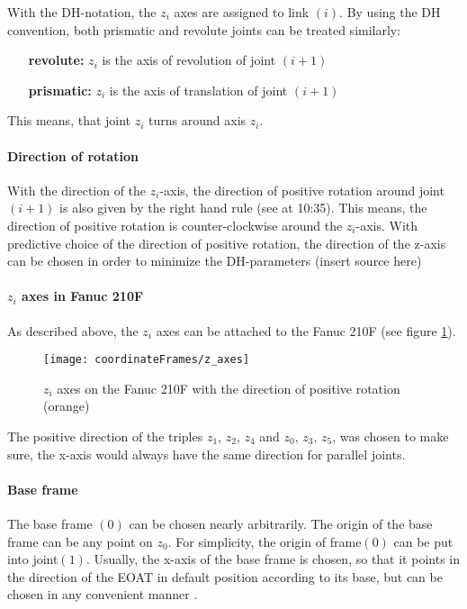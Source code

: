 With the DH-notation, the $z_i$ axes are assigned to link $(i)$. 
By using the  DH convention, both prismatic and revolute joints can be treated similarly: %
\begin{itemize}[wide=\parindent]
	\item[\textbf{revolute:}] $z_i$ is the axis of revolution of joint $(i+1)$
	\item[\textbf{prismatic:}] $z_i$ is the axis of translation of joint $(i+1)$
\end{itemize}
This means, that joint $z_i$ turns around axis $z_i$.

\paragraph{Direction of rotation}
With the direction of the $z_i$-axis, the direction of positive rotation around joint $(i+1)$ is also given by the right hand rule (see \cite{Angela_U1S2P1} at 10:35). This means, the direction of positive rotation is counter-clockwise around the $z_i$-axis.
With predictive choice of the direction of positive rotation, the direction of the z-axis can be chosen in order to minimize the DH-parameters (insert source here)

\paragraph{$z_i$ axes in Fanuc 210F}
As described above, the $z_i$ axes can be attached to the Fanuc 210F (see figure \ref{fig:zi_Axes}).


\begin{figure}[H]
	\texttt{[image: coordinateFrames/z\_axes]}
	\caption{$z_i$ axes on the Fanuc 210F with the direction of positive rotation (orange)}
	\label{fig:zi_Axes}
\end{figure}

The positive direction of the triples $z_1$, $z_2$, $z_4$ and $z_0$, $z_3$, $z_5$, was chosen to make sure, the x-axis would always have the same direction for parallel joints. 

\paragraph{Base frame}

The base frame $(0)$ can be chosen nearly arbitrarily. The origin of the base frame can be any point on $z_0$. For simplicity, the origin of frame$(0)$ can be put into joint$(1)$.  Usually, the x-axis of the base frame is chosen, so that it points in the direction of the \ac{EOAT} in default position according to its base, \cite{DenavitHartenbergKonventionen} but can be chosen in any convenient manner \cite{SpongDynContr}.

